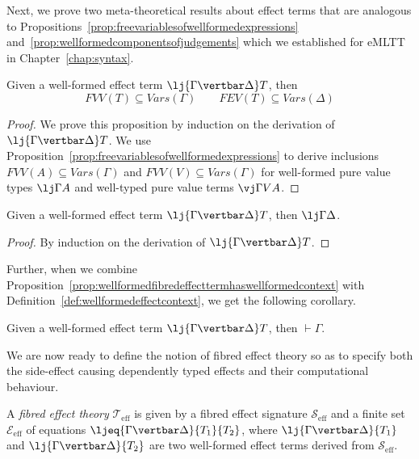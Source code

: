 Next, we prove two meta-theoretical results about effect terms that are analogous to Propositions~\ref{prop:freevariablesofwellformedexpressions} and~\ref{prop:wellformedcomponentsofjudgements} which we established for eMLTT in Chapter~\ref{chap:syntax}.

\begin{proposition}
\label{prop:freevariablesofeffectterms}
Given a well-formed effect term $\lj {\Gamma \vertbar \Delta} T$, then 
\[
FVV(T) \subseteq V\!ars(\Gamma)
\qquad
F\!EV(T) \subseteq V\!ars(\Delta)
\]
\end{proposition}

\begin{proof}
We prove this proposition by induction on the derivation of $\lj {\Gamma \vertbar \Delta} T$. We use Proposition~\ref{prop:freevariablesofwellformedexpressions} to derive inclusions $FVV(A) \subseteq V\!ars(\Gamma)$ and $FVV(V) \subseteq V\!ars(\Gamma)$ for well-formed pure value types $\lj \Gamma A$ and well-typed pure value terms $\vj \Gamma V A$.
\end{proof}

\begin{proposition}
\label{prop:wellformedfibredeffecttermhaswellformedcontext}
Given a well-formed effect term $\lj {\Gamma \vertbar \Delta} T$, then $\lj \Gamma \Delta$.
\end{proposition}

\begin{proof}
By induction on the derivation of $\lj {\Gamma \vertbar \Delta} T$.
\end{proof}

Further, when we combine Proposition~\ref{prop:wellformedfibredeffecttermhaswellformedcontext} with Definition~\ref{def:wellformedeffectcontext}, we get the following corollary.

\begin{corollary}
Given a well-formed effect term $\lj {\Gamma \vertbar \Delta} T$, then $\vdash \Gamma$.
\end{corollary}

We are now ready to define the notion of fibred effect theory so as to specify both the side-effect causing dependently typed effects and their computational behaviour.

\begin{definition}
A \emph{fibred effect theory} $\mathcal{T}_{\text{eff}}$ is given by a fibred effect signature $\mathcal{S}_{\text{eff}}$ and a finite set $\mathcal{E}_{\text{eff}}$ of equations $\ljeq {\Gamma \vertbar \Delta} {T_1} {T_2}$, where $\lj {\Gamma \vertbar \Delta} {T_1}$ and $\lj {\Gamma \vertbar \Delta} {T_2}$ are two well-formed  effect terms derived from $\mathcal{S}_{\text{eff}}$. 
\end{definition}

